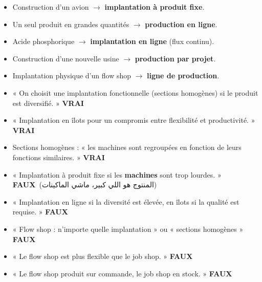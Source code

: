 \documentclass[11pt,a4paper]{article}
\newcommand{\ar}[1]{\textarabic{#1}}
\newcommand{\vrai}{\textcolor{vert}{\textbf{VRAI}}}
\newcommand{\faux}{\textcolor{rouge}{\textbf{FAUX}}}
\begin{document}
\begin{examen}
\begin{itemize}
\item Construction d'un avion $\rightarrow$ \textbf{implantation à produit fixe}.
\item Un seul produit en grandes quantités $\rightarrow$ \textbf{production en ligne}.
\item Acide phosphorique $\rightarrow$ \textbf{implantation en ligne} (flux continu).
\item Construction d'une nouvelle usine $\rightarrow$ \textbf{production par projet}.
\item Implantation physique d'un flow shop $\rightarrow$ \textbf{ligne de production}.
\item « On choisit une implantation fonctionnelle (sections homogènes) si le produit est diversifié. » \vrai
\item « Implantation en îlots pour un compromis entre flexibilité et productivité. » \vrai
\item Sections homogènes : « les machines sont regroupées en fonction de leurs fonctions similaires. » \vrai
\end{itemize}
\end{examen}
\begin{piege}
\begin{itemize}
\item « Implantation à produit fixe si les \textbf{machines} sont trop lourdes. » \faux \ \ar{(المنتوج هو اللي كبير، ماشي الماكينات)}
\item « Implantation en ligne si la diversité est élevée, en îlots si la qualité est requise. » \faux
\item « Flow shop : n'importe quelle implantation » ou « sections homogènes » \faux
\item « Le flow shop est plus flexible que le job shop. » \faux
\item « Le flow shop produit sur commande, le job shop en stock. » \faux
\end{itemize}
\end{piege}
\end{document}
